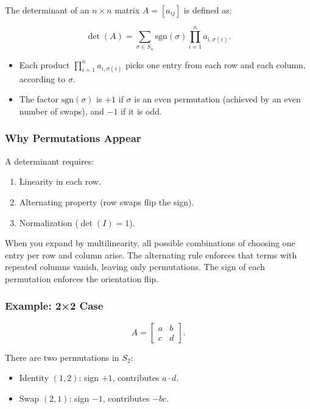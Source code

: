 \documentclass[
  letterpaper,
  DIV=11,
  numbers=noendperiod]{scrreprt}
\providecommand{\tightlist}{%
  \setlength{\itemsep}{0pt}\setlength{\parskip}{0pt}}
\begin{document}
The determinant of an \(n \times n\) matrix \(A = [a_{ij}]\) is defined
as:

\[
\det(A) = \sum_{\sigma \in S_n} \text{sgn}(\sigma) \prod_{i=1}^n a_{i, \sigma(i)}.
\]

\begin{itemize}
\tightlist
\item
  Each product \(\prod_{i=1}^n a_{i, \sigma(i)}\) picks one entry from
  each row and each column, according to \(\sigma\).
\item
  The factor \(\text{sgn}(\sigma)\) is \(+1\) if \(\sigma\) is an even
  permutation (achieved by an even number of swaps), and \(-1\) if it is
  odd.
\end{itemize}

\subsubsection{Why Permutations Appear}\label{why-permutations-appear}

A determinant requires:

\begin{enumerate}
\def\labelenumi{\arabic{enumi}.}
\tightlist
\item
  Linearity in each row.
\item
  Alternating property (row swaps flip the sign).
\item
  Normalization (\(\det(I)=1\)).
\end{enumerate}

When you expand by multilinearity, all possible combinations of choosing
one entry per row and column arise. The alternating rule enforces that
terms with repeated columns vanish, leaving only permutations. The sign
of each permutation enforces the orientation flip.

\subsubsection{Example: 2×2 Case}\label{example-22-case-1}

\[
A = \begin{bmatrix} a & b \\ c & d \end{bmatrix}.
\]

There are two permutations in \(S_2\):

\begin{itemize}
\tightlist
\item
  Identity \((1,2)\): sign \(+1\), contributes \(a \cdot d\).
\item
  Swap \((2,1)\): sign \(-1\), contributes \(-bc\).
\end{itemize}
\end{document}
